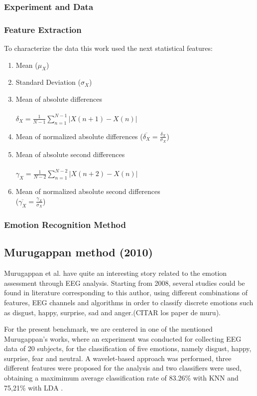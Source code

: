 \documentclass{sig-alternate}
\begin{document}
\subsubsection{Experiment and Data}


\subsubsection{Feature Extraction}

To characterize the data this work used the next statistical features:
\begin{enumerate}
\item Mean ($\mu_{X}$)
\item Standard Deviation ($\sigma_{X}$)
\item Mean of absolute differences \\ \\ $\delta_{X} = \frac{1}{N-1} \sum^{N-1}_{n=1}|X(n+1)-X(n)|$
\item Mean of normalized absolute differences ($\overline{\delta_{X}} = \frac{\delta_{X}}{\sigma_{X}}$)
\item Mean of absolute second differences \\ \\ $\gamma_{X} = \frac{1}{N-2} \sum^{N-2}_{n=1}|X(n+2)-X(n)|$
\item Mean of normalized absolute second differences \\ ($\overline{\gamma_{X}} = \frac{\gamma_{X}}{\sigma_{X}}$)
\end{enumerate}  

\subsubsection{Emotion Recognition Method}
	

\subsection{Murugappan method (2010)}	

Murugappan et al. have quite an interesting story related to the emotion assessment through EEG analysis. Starting from 2008, several studies could be found in literature corresponding to this author, using different combinations of features, EEG channels and algorithms in order to classify discrete emotions such as disgust, happy, surprise, sad and anger.(CITAR los paper de muru).

For the present benchmark, we are centered in one of the mentioned Murugappan's works, where an experiment was conducted for collecting EEG data of 20 subjects, for the classification of five emotions, namely disgust, happy, surprise, fear and neutral. A wavelet-based approach was performed, three different features were proposed for the analysis and two classifiers were used, obtaining a maximimum average classification rate of 83.26\% with KNN and 75,21\% with LDA \cite{Murugappan2010Classification}.
\end{document}
